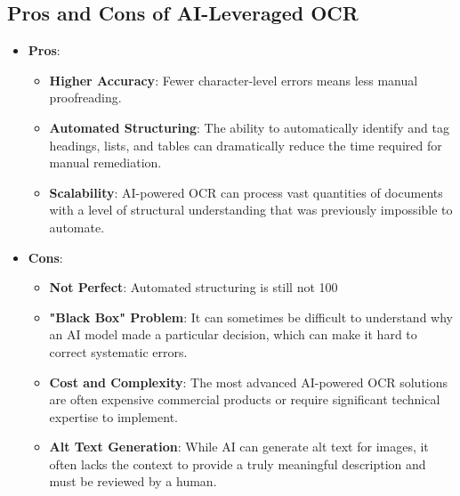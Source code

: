 \subsection{Pros and Cons of AI-Leveraged OCR}
\label{subsec:ai-ocr-pros-cons}
\begin{itemize}
	\item \textbf{Pros}:
	      \begin{itemize}
		      \item \textbf{Higher Accuracy}: Fewer character-level errors means less manual proofreading.
		      \item \textbf{Automated Structuring}: The ability to automatically identify and tag headings, lists, and tables can dramatically reduce the time required for manual remediation.
		      \item \textbf{Scalability}: AI-powered OCR can process vast quantities of documents with a level of structural understanding that was previously impossible to automate.
	      \end{itemize}
	\item \textbf{Cons}:
	      \begin{itemize}
		      \item \textbf{Not Perfect}: Automated structuring is still not 100%
		      \item \textbf{"Black Box" Problem}: It can sometimes be difficult to understand why an AI model made a particular decision, which can make it hard to correct systematic errors.
		      \item \textbf{Cost and Complexity}: The most advanced AI-powered OCR solutions are often expensive commercial products or require significant technical expertise to implement.
		      \item \textbf{Alt Text Generation}: While AI can generate alt text for images, it often lacks the context to provide a truly meaningful description and must be reviewed by a human.
	      \end{itemize}
\end{itemize}

